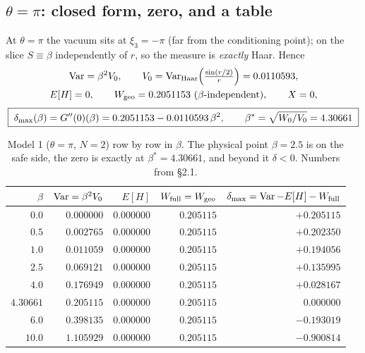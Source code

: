 \subsection{$\theta=\pi$: closed form, zero, and a table}

At $\theta=\pi$ the vacuum sits at $\xi_3=-\pi$ (far from the conditioning point); on the slice
$S\equiv\beta$ independently of $r$, so the measure is \emph{exactly} Haar. Hence \LT
\begin{gather}
  \operatorname{Var}=\beta^{2}V_0,\qquad
  V_0=\operatorname{Var}_{\mathrm{Haar}}\!\Big(\tfrac{\sin(r/2)}{r}\Big)=0.0110593,\notag\\
  E[H]=0,\qquad W_{\mathrm{geo}} = 0.2051153\ (\beta\text{-independent}),\qquad
  X=0 ,\notag
\end{gather}
\begin{equation}
  \boxed{\;\delta_{\max}(\beta)=G''(0)(\beta)=0.2051153-0.0110593\,\beta^{2},
  \qquad \beta^{*}=\sqrt{W_0/V_0}=4.30661\;}
  \label{eq:delta-beta}
\end{equation}

\begin{table}[h]
\centering\footnotesize
\setlength{\tabcolsep}{7pt}
\renewcommand{\arraystretch}{1.1}
\begin{tabular}{@{}r r r r r@{}}
\toprule
$\beta$ & $\operatorname{Var}=\beta^{2}V_0$ & $E[H]$ & $W_{\mathrm{full}}=W_{\mathrm{geo}}$ & $\delta_{\max}=\operatorname{Var}-E[H]-W_{\mathrm{full}}$\\
\midrule
$0.0$      & $0.000000$ & $0.000000$ & $0.205115$ & $+0.205115$\\
$0.5$      & $0.002765$ & $0.000000$ & $0.205115$ & $+0.202350$\\
$1.0$      & $0.011059$ & $0.000000$ & $0.205115$ & $+0.194056$\\
$\mathbf{2.5}$ & $\mathbf{0.069121}$ & $\mathbf{0.000000}$ & $\mathbf{0.205115}$ & $\mathbf{+0.135995}$\\
$4.0$      & $0.176949$ & $0.000000$ & $0.205115$ & $+0.028167$\\
$\mathbf{4.30661}$ & $\mathbf{0.205115}$ & $\mathbf{0.000000}$ & $\mathbf{0.205115}$ & $\mathbf{0.000000}$\\
$\mathbf{6.0}$ & $\mathbf{0.398135}$ & $\mathbf{0.000000}$ & $\mathbf{0.205115}$ & $\mathbf{-0.193019}$\\
$10.0$     & $1.105929$ & $0.000000$ & $0.205115$ & $-0.900814$\\
\bottomrule
\end{tabular}
\caption{Model 1 ($\theta=\pi$, $N=2$) row by row in $\beta$. The physical point $\beta=2.5$ is on the
safe side, the zero is exactly at $\beta^{*}=4.30661$, and beyond it $\delta<0$. Numbers from
 \S2.1.}
\label{tab:model1}
\end{table}


